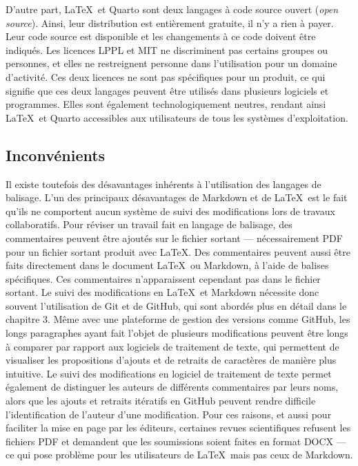 \documentclass[
  letterpaper,
  DIV=11,
  numbers=noendperiod]{scrreprt}
\begin{document}
D'autre part, \LaTeX~et Quarto sont deux langages à code source ouvert
(\emph{open source}). Ainsi, leur distribution est entièrement gratuite,
il n'y a rien à payer. Leur code source est disponible et les
changements à ce code doivent être indiqués. Les licences LPPL et MIT ne
discriminent pas certains groupes ou personnes, et elles ne restreignent
personne dans l'utilisation pour un domaine d'activité. Ces deux
licences ne sont pas spécifiques pour un produit, ce qui signifie que
ces deux langages peuvent être utilisés dans plusieurs logiciels et
programmes. Elles sont également technologiquement neutres, rendant
ainsi \LaTeX~et Quarto accessibles aux utilisateurs de tous les systèmes
d'exploitation.

\hypertarget{inconvuxe9nients}{%
\subsection{Inconvénients}\label{inconvuxe9nients}}

Il existe toutefois des désavantages inhérents à l'utilisation des
langages de balisage. L'un des principaux désavantages de Markdown et de
\LaTeX~est le fait qu'ils ne comportent aucun système de suivi des
modifications lors de travaux collaboratifs. Pour réviser un travail
fait en langage de balisage, des commentaires peuvent être ajoutés sur
le fichier sortant --- nécessairement PDF pour un fichier sortant
produit avec \LaTeX. Des commentaires peuvent aussi être faits
directement dans le document \LaTeX~ou Markdown, à l'aide de balises
spécifiques. Ces commentaires n'apparaissent cependant pas dans le
fichier sortant. Le suivi des modifications en \LaTeX~et Markdown
nécessite donc souvent l'utilisation de Git et de GitHub, qui sont
abordés plus en détail dans le chapitre 3. Même avec une plateforme de
gestion des versions comme GitHub, les longs paragraphes ayant fait
l'objet de plusieurs modifications peuvent être longs à comparer par
rapport aux logiciels de traitement de texte, qui permettent de
visualiser les propositions d'ajouts et de retraits de caractères de
manière plus intuitive. Le suivi des modifications en logiciel de
traitement de texte permet également de distinguer les auteurs de
différents commentaires par leurs noms, alors que les ajouts et retraits
itératifs en GitHub peuvent rendre difficile l'identification de
l'auteur d'une modification. Pour ces raisons, et aussi pour faciliter
la mise en page par les éditeurs, certaines revues scientifiques
refusent les fichiers PDF et demandent que les soumissions soient faites
en format DOCX --- ce qui pose problème pour les utilisateurs de
\LaTeX~mais pas ceux de Markdown.
\end{document}

